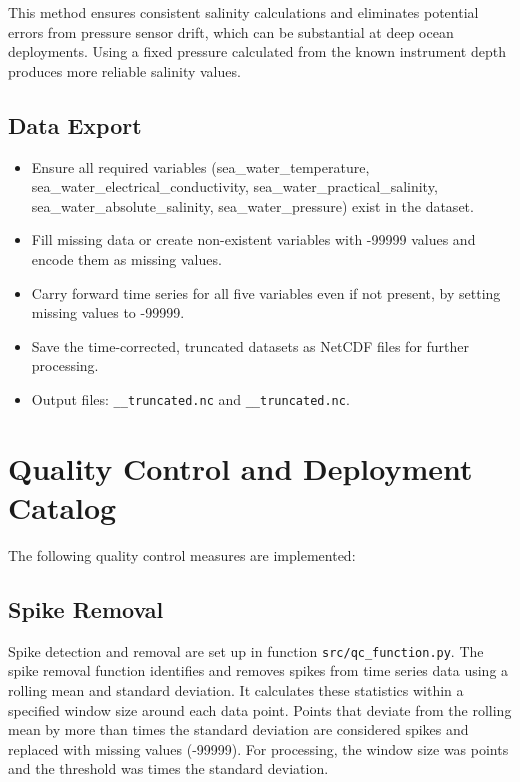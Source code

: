 This method ensures consistent salinity calculations and eliminates potential errors from pressure sensor drift, 
which can be substantial at deep ocean deployments. 
Using a fixed pressure calculated from the known instrument depth produces more reliable salinity values.

\subsection{Data Export}

\begin{itemize}
\item Ensure all required variables (sea\_water\_temperature, sea\_water\_electrical\_conductivity, sea\_water\_practical\_salinity, sea\_water\_absolute\_salinity, sea\_water\_pressure) exist in the dataset.
\item Fill missing data or create non-existent variables with -99999 values and encode them as missing values.
\item Carry forward time series for all five variables even if not present, by setting missing values to -99999.
\item Save the time-corrected, truncated datasets as NetCDF files for further processing.
\item Output files: 
\texttt{\projectname\casenumber\_\FirstInstrument\_truncated.nc}
and \texttt{\projectname\casenumber\_\SecondInstrument\_truncated.nc}.
\end{itemize}


\section{Quality Control and Deployment Catalog}
The following quality control measures are implemented:

\subsection{Spike Removal}
Spike detection and removal are set up in function \texttt{src/qc\_function.py}. 
The spike removal function identifies and removes spikes from time series data using a rolling mean and standard deviation. 
It calculates these statistics within a specified window size around each data point. 
Points that deviate from the rolling mean by more than \ThresholdValue{} times the standard deviation are considered spikes and replaced with missing values (-99999). 
For \displayprojectname{} \casenumber{} processing, the window size was \WindowSize{} points and the threshold was \ThresholdValue{} times the standard deviation.

